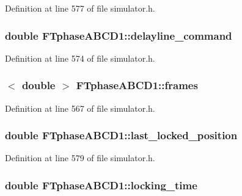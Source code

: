 Definition at line 577 of file simulator.h.

\hypertarget{classFTphaseABCD1_a8e37a1aea38e03d633c275d7036fd271}{
\subsubsection[{delayline\_\-command}]{\setlength{\rightskip}{0pt plus 5cm}double {\bf FTphaseABCD1::delayline\_\-command}}}
\label{classFTphaseABCD1_a8e37a1aea38e03d633c275d7036fd271}


Definition at line 574 of file simulator.h.

\hypertarget{classFTphaseABCD1_a0a01ea5ba57497af7e81d6d0ceeac368}{
\subsubsection[{frames}]{$<$ double $>$ {\bf FTphaseABCD1::frames}}}
\label{classFTphaseABCD1_a0a01ea5ba57497af7e81d6d0ceeac368}


Definition at line 567 of file simulator.h.

\hypertarget{classFTphaseABCD1_ae3ce6899a79a34d27116f152b1bd47b6}{
\subsubsection[{last\_\-locked\_\-position}]{\setlength{\rightskip}{0pt plus 5cm}double {\bf FTphaseABCD1::last\_\-locked\_\-position}}}
\label{classFTphaseABCD1_ae3ce6899a79a34d27116f152b1bd47b6}


Definition at line 579 of file simulator.h.

\hypertarget{classFTphaseABCD1_af50041e16ad65a4e806fc880dac97349}{
\subsubsection[{locking\_\-time}]{\setlength{\rightskip}{0pt plus 5cm}double {\bf FTphaseABCD1::locking\_\-time}}}
\label{classFTphaseABCD1_af50041e16ad65a4e806fc880dac97349}


